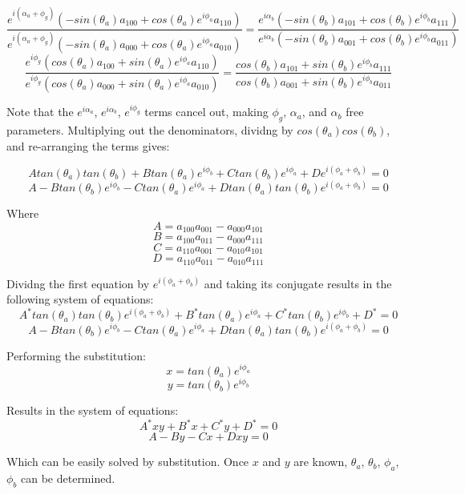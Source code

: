 \documentclass{article}
\begin{document}
$$\frac{e^{i(\alpha_a + \phi_g)}(-sin(\theta_a)a_{100} + cos(\theta_a)e^{i\phi_a}a_{110})}{e^{i(\alpha_a + \phi_g)}(-sin(\theta_a)a_{000} + cos(\theta_a)e^{i\phi_a}a_{010})} = 
\frac{e^{i\alpha_b}(-sin(\theta_b)a_{101} + cos(\theta_b)e^{i\phi_b}a_{111})}{e^{i\alpha_b}(-sin(\theta_b)a_{001} + cos(\theta_b)e^{i\phi_b}a_{011})}$$
$$\frac{e^{i\phi_g}(cos(\theta_a)a_{100} + sin(\theta_a)e^{i\phi_a}a_{110})}{e^{i\phi_g}(cos(\theta_a)a_{000} + sin(\theta_a)e^{i\phi_a}a_{010})} = \frac{cos(\theta_b)a_{101} + sin(\theta_b)e^{i\phi_b}a_{111}}
{cos(\theta_b)a_{001} + sin(\theta_b)e^{i\phi_b}a_{011}}$$

Note that the $e^{i\alpha_a}$, $e^{i\alpha_b}$, $e^{i\phi_g}$ terms cancel out,
making $\phi_g$, $\alpha_a$, and $\alpha_b$ free parameters. Multiplying out
the denominators, dividng by $cos(\theta_a)cos(\theta_b)$, and re-arranging the
terms gives:

$$Atan(\theta_a)tan(\theta_b) + Btan(\theta_a)e^{i\phi_b} + Ctan(\theta_b)e^{i\phi_a} + De^{i(\phi_a + \phi_b)} = 0$$
$$A - Btan(\theta_b)e^{i\phi_b} - Ctan(\theta_a)e^{i\phi_a} + Dtan(\theta_a)tan(\theta_b)e^{i(\phi_a + \phi_b)} = 0$$

Where
$$A = a_{100}a_{001} - a_{000}a_{101}$$
$$B = a_{100}a_{011} - a_{000}a_{111}$$
$$C = a_{110}a_{001} - a_{010}a_{101}$$
$$D = a_{110}a_{011} - a_{010}a_{111}$$

Dividng the first equation by $e^{i(\phi_a + \phi_b)}$ and taking its conjugate
results in the following system of equations:
$$A^*tan(\theta_a)tan(\theta_b)e^{i(\phi_a + \phi_b)} + B^*tan(\theta_a)e^{i\phi_a} + C^*tan(\theta_b)e^{i\phi_b} + D^* = 0$$
$$A - Btan(\theta_b)e^{i\phi_b} - Ctan(\theta_a)e^{i\phi_a} + Dtan(\theta_a)tan(\theta_b)e^{i(\phi_a + \phi_b)} = 0$$

Performing the substitution:
$$x = tan(\theta_a)e^{i\phi_a}$$
$$y = tan(\theta_b)e^{i\phi_b}$$

Results in the system of equations:
$$A^*xy + B^*x + C^*y + D^* = 0$$
$$A - By - Cx + Dxy = 0$$

Which can be easily solved by substitution. Once $x$ and $y$ are known, 
$\theta_a$, $\theta_b$, $\phi_a$, $\phi_b$ can be determined.
\end{document}
